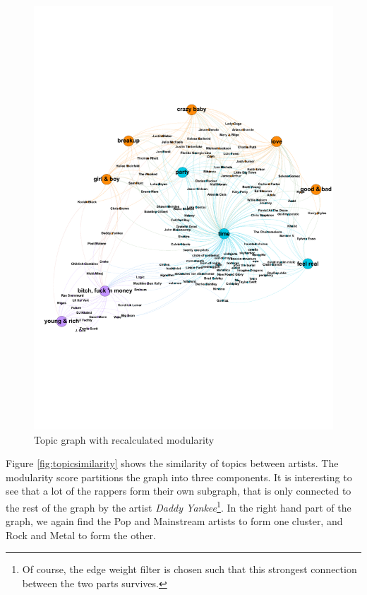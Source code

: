 \documentclass[10pt,a4paper]{article}
\begin{document}
		\begin{figure}[htb]
			\centering
			\includegraphics[trim=0mm 60mm 0mm 50mm, clip, width=\linewidth]{data/topic_graph_new_modularity}
			\caption{Topic graph with recalculated modularity}
			\label{fig:topicnewmod}
		\end{figure}
		
		Figure \ref{fig:topicsimilarity} shows the similarity of topics between artists. The modularity score partitions the graph into three components. It is interesting to see that a lot of the rappers form their own subgraph, that is only connected to the rest of the graph by the artist \textit{Daddy Yankee}\footnote{Of course, the edge weight filter is chosen such that this strongest connection between the two parts survives.}. In the right hand part of the graph, we again find the Pop and Mainstream artists to form one cluster, and Rock and Metal to form the other.
		
\end{document}
